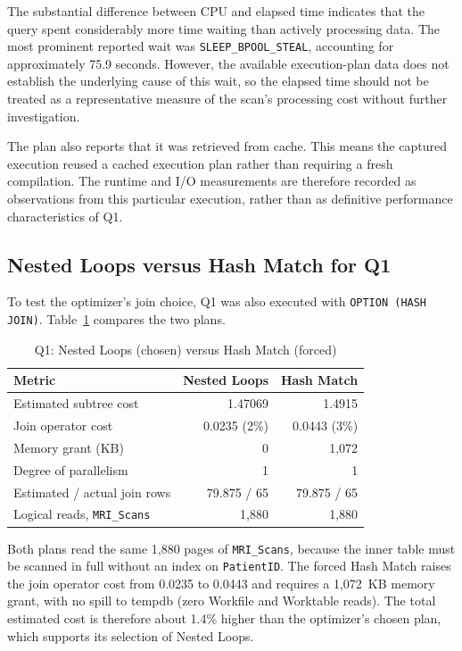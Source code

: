The substantial difference between CPU and elapsed time indicates that the query spent considerably more time waiting than actively processing data. The most prominent reported wait was \texttt{SLEEP\_BPOOL\_STEAL}, accounting for approximately 75.9 seconds. However, the available execution-plan data does not establish the underlying cause of this wait, so the elapsed time should not be treated as a representative measure of the scan's processing cost without further investigation.

The plan also reports that it was retrieved from cache. This means the captured execution reused a cached execution plan rather than requiring a fresh compilation. The runtime and I/O measurements are therefore recorded as observations from this particular execution, rather than as definitive performance characteristics of Q1.

\subsection{Nested Loops versus Hash Match for Q1}

To test the optimizer's join choice, Q1 was also executed with \texttt{OPTION (HASH JOIN)}. Table~\ref{tab:q1-join-comparison} compares the two plans.

\begin{table}[htbp]
\centering
\caption{Q1: Nested Loops (chosen) versus Hash Match (forced)}
\label{tab:q1-join-comparison}
\begin{tabular}{lrr}
\toprule
Metric & Nested Loops & Hash Match \\
\midrule
Estimated subtree cost & 1.47069 & 1.4915 \\
Join operator cost & 0.0235 (2\%) & 0.0443 (3\%) \\
Memory grant (KB) & 0 & 1,072 \\
Degree of parallelism & 1 & 1 \\
Estimated / actual join rows & 79.875 / 65 & 79.875 / 65 \\
Logical reads, \texttt{MRI\_Scans} & 1,880 & 1,880 \\
\bottomrule
\end{tabular}
\end{table}

Both plans read the same 1,880 pages of \texttt{MRI\_Scans}, because the inner table must be scanned in full without an index on \texttt{PatientID}. The forced Hash Match raises the join operator cost from 0.0235 to 0.0443 and requires a 1,072~KB memory grant, with no spill to tempdb (zero Workfile and Worktable reads). The total estimated cost is therefore about 1.4\% higher than the optimizer's chosen plan, which supports its selection of Nested Loops.

